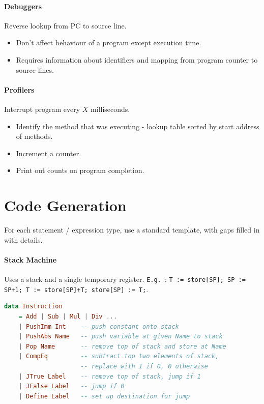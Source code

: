 \documentclass[twocolumn,english]{article}
\let\emph\relax
\begin{document}
\paragraph{Debuggers}

Reverse lookup from PC to source line. 
\begin{itemize}
\item Don't affect behaviour of a program except execution time. 
\item Requires information about identifiers and mapping from program counter
to source lines. 
\end{itemize}

\paragraph{Profilers}

Interrupt program every $X$ milliseconds. 
\begin{itemize}
\item Identify the method that was executing - lookup table sorted by start
address of methods. 
\item Increment a counter. 
\item Print out counts on program completion. 
\end{itemize}

\section{Code Generation}

For each statement / expression type, use a standard template, with
gaps filled in with details.


\paragraph{Stack Machine}

Uses a stack and a single temporary register. \texttt{E.g. }\texttt{\emph{Add}}:
\texttt{T := store{[}SP{]}; SP := SP+1; T := store{[}SP{]}+T; store{[}SP{]}
:= T;}.
\begin{lstlisting}[language=Haskell,tabsize=2]
data Instruction
	= Add | Sub | Mul | Div ...
	| PushImm Int    -- push constant onto stack
	| PushAbs Name   -- push variable at given Name to stack
	| Pop Name       -- remove top of stack and store at Name
	| CompEq         -- subtract top two elements of stack,
	                 -- replace with 1 if 0, 0 otherwise
	| JTrue Label    -- remove top of stack, jump if 1
	| JFalse Label   -- jump if 0
	| Define Label   -- set up destination for jump
\end{lstlisting}
\end{document}
